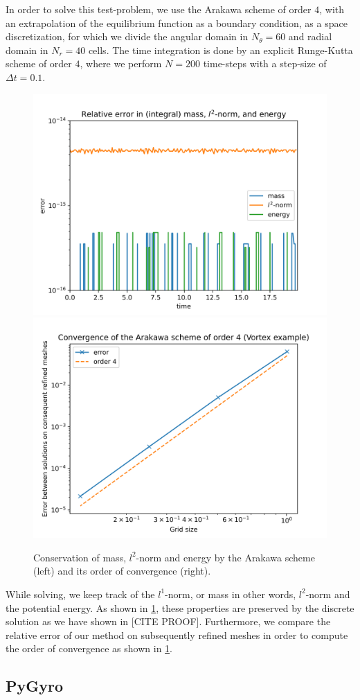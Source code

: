 In order to solve this test-problem, we use the Arakawa scheme of order $4$, with an extrapolation of the equilibrium function as a boundary condition, as a space discretization, for which we divide the angular domain in $N_\theta = 60$ and radial domain in $N_r = 40$ cells. The time integration is done by an explicit Runge-Kutta scheme of order $4$, where we perform $N = 200$ time-steps with a step-size of $\Delta t = 0.1$.
\begin{figure}[h]
	\centering
	\includegraphics[width=0.45\linewidth]{plots/vortex_cons.png}
	\includegraphics[width=0.45\linewidth]{plots/vortex_conv.png}
	\caption{Conservation of mass, $l^2$-norm and energy by the Arakawa scheme (left) and its order of convergence (right).}
	\label{fig:vortex_con}
\end{figure}
While solving, we keep track of the $l^1$-norm, or mass in other words, $l^2$-norm and the potential energy. As shown in \ref{fig:vortex_con}, these properties are preserved by the discrete solution as we have shown in [CITE PROOF]. Furthermore, we compare the relative error of our method on subsequently refined meshes in order to compute the order of convergence as shown in \ref{fig:vortex_con}. 
\subsection{PyGyro}

